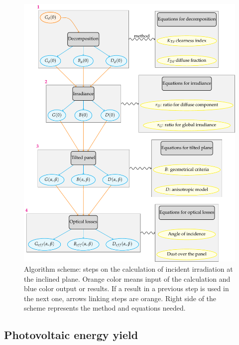 \begin{figure}
  \centering
  \includegraphics[width=1\textwidth]{DataMethodsFIGS/algorithm_outline}
  \caption[Steps for obtaining $G_{eff}$]{Algorithm scheme: steps on the calculation of incident irradiation at the inclined plane. Orange color means input of the calculation and blue color output or results. If a result in a previous step is used in the next one, arrows linking steps are orange. Right side of the scheme represents the method and equations needed.}
 \label{fig:algorithm_outline}
\end{figure}

\subsection{Photovoltaic energy yield}


